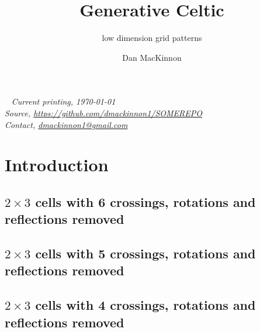 \documentclass{tufte-book}
\title{Generative Celtic}
\subtitle{low dimension grid patterns}
\author[]{Dan MacKinnon}
\begin{document}
\maketitle


\newpage
\begin{fullwidth}
~\vfill
\thispagestyle{empty}
\setlength{\parindent}{0pt}
\textit{Current printing, \today}\\
\textit{Source, \url{https://github.com/dmackinnon1/SOMEREPO}}\\
\textit{Contact, \href{mailto://dmackinnon1@gmail.com}{dmackinnon1@gmail.com}}
\end{fullwidth}

\cleardoublepage

\chapter*{Introduction}


\newpage

\scalebox{0.6}{
\begin{minipage}{18cm}

\end{minipage}
}

\newpage
\section{$2\times 3$ cells with 6 crossings, rotations and reflections removed}

%

\newpage
\section{$2\times 3$ cells with 5 crossings, rotations and reflections removed}

%

\newpage
\section{$2\times 3$ cells with 4 crossings, rotations and reflections removed}

\end{document}
